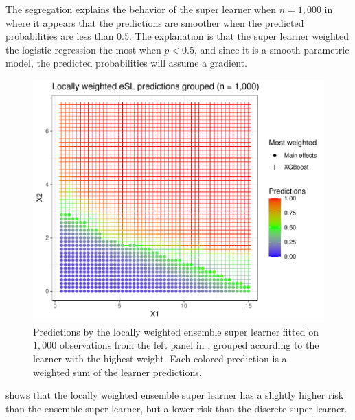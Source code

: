 \documentclass[./main.tex]{subfiles}
\begin{document}
The segregation explains the behavior of the super learner when $ n = 1,000 $ in  where it appears that the predictions are smoother when the predicted probabilities are less than $ 0.5 $. The explanation is that the super learner weighted the logistic regression the most when $ p < 0.5 $, and since it is a smooth parametric model, the predicted probabilities will assume a gradient. 
\begin{figure}[H]
    \centering
    \includegraphics[width=\textwidth]{figures/esl_preds_lw_stratified.pdf}
    \caption{Predictions by the locally weighted ensemble super learner fitted on $ 1,000 $ observations from the left panel in , grouped according to the learner with the highest weight. Each colored prediction is a weighted sum of the learner predictions.}
    \label{fig:esl_preds_lw_stratified}
\end{figure}
 shows that the locally weighted ensemble super learner has a slightly higher risk than the ensemble super learner, but a lower risk than the discrete super learner. 
\end{document}
